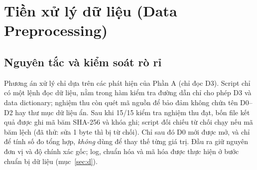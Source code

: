 \section{Tiền xử lý dữ liệu (Data Preprocessing)}
\label{sec:c}

\subsection{Nguyên tắc và kiểm soát rò rỉ}
Phương án xử lý chỉ dựa trên các phát hiện của Phần A (chỉ đọc D3). Script  chỉ có một lệnh đọc dữ liệu, nằm trong hàm kiểm tra đường dẫn chỉ cho phép D3 và data dictionary;
nghiệm thu còn quét mã nguồn để bảo đảm không chứa tên D0--D2 hay thư mục dữ liệu ẩn. Sau khi 15/15 kiểm tra nghiệm thu đạt, bốn file kết quả được ghi mã băm SHA-256 và khóa ghi;
script đối chiếu  từ chối chạy nếu mã băm lệch (đã thử: sửa 1 byte thì bị từ chối). Chỉ sau đó D0 mới được mở, và chỉ để tính số đo tổng hợp, \emph{không} dùng để thay thế từng giá trị.
Đầu ra giữ nguyên đơn vị và độ chính xác gốc; log, chuẩn hóa và mã hóa được thực hiện ở bước chuẩn bị dữ liệu (mục~\ref{sec:d}).

